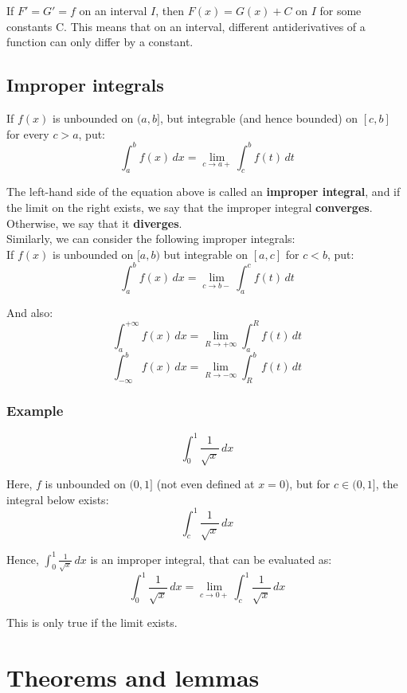 \documentclass[11pt]{article}
\begin{document}
If \(F' = G' = f\) on an interval \(I\), then \(F(x) = G(x) + C\) on \(I\) for some constants C. This means that on an interval, different antiderivatives of a function can only differ by a constant.

\subsection{Improper integrals}
\label{sec:orga4ecce4}
If \(f(x)\) is unbounded on \((a, b]\), but integrable (and hence bounded) on \([c, b]\) for every \(c > a\), put:
\[\int_a^b f(x) \, dx = \lim_{c \rightarrow a+} \int_c^b f(t) \, dt\]

The left-hand side of the equation above is called an \textbf{improper integral}, and if the limit on the right exists, we say that the improper integral \textbf{converges}. Otherwise, we say that it \textbf{diverges}.
\\[0pt]

Similarly, we can consider the following improper integrals:
\\[0pt]

If \(f(x)\) is unbounded on \([a, b)\) but integrable on \([a, c]\) for \(c < b\), put:
\[\int_a^b f(x) \, dx = \lim_{c \rightarrow b-} \int_a^c f(t) \, dt\]

And also:
\[\int_a^{+ \infty} f(x) \, dx = \lim_{R \rightarrow +\infty} \int_a^R f(t) \, dt\]
\[\int_{- \infty}^b f(x) \, dx = \lim_{R \rightarrow - \infty} \int_R^b f(t) \, dt\]

\newpage

\subsubsection{Example}
\label{sec:orgd743a46}
\[\int_0^1 \frac{1}{\sqrt{x}} \, dx\]

Here, \(f\) is unbounded on \((0, 1]\) (not even defined at \(x = 0\)), but for \(c \in (0, 1]\), the integral below exists:
\[\int_c^1 \frac{1}{\sqrt{x}} \, dx\]

Hence, \(\int_0^1 \frac{1}{\sqrt{x}} \, dx\) is an improper integral, that can be evaluated as:
\[\int_0^1 \frac{1}{\sqrt{x}} \, dx = \lim_{c \rightarrow 0+} \int_c^1 \frac{1}{\sqrt{x}} \, dx\]

This is only true if the limit exists.

\section{Theorems and lemmas}
\label{sec:orge2a32d4}
\end{document}
